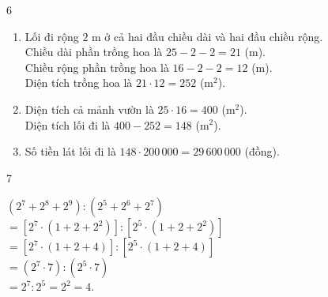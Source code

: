 \begin{Solbook}{6}
 \par \noindent  \begin {enumerate} \item Lối đi rộng $2$ m ở cả hai đầu chiều dài và hai đầu chiều rộng.\\ Chiều dài phần trồng hoa là $25-2-2=21$ (m).\\ Chiều rộng phần trồng hoa là $16-2-2=12$ (m).\\ Diện tích trồng hoa là $21\cdot 12=252$ (m$^{2}$). \item Diện tích cả mảnh vườn là $25\cdot 16=400$ (m$^{2}$).\\ Diện tích lối đi là $400-252=148$ (m$^{2}$). \item Số tiền lát lối đi là $148\cdot 200\,000=29\,600\,000$ (đồng). \end {enumerate}  \hfill \qedEX 
\end{Solbook}
\begin{Solbook}{7}
 \par \noindent  $\left (2^{7}+2^{8}+2^{9}\right ):\left (2^{5}+2^{6}+2^{7}\right )$\\ $=\left [2^{7}\cdot (1+2+2^{2})\right ]:\left [2^{5}\cdot (1+2+2^{2})\right ]$\\ $=\left [2^{7}\cdot (1+2+4)\right ]:\left [2^{5}\cdot (1+2+4)\right ]$\\ $=(2^{7}\cdot 7):(2^{5}\cdot 7)$\\ $=2^{7}:2^{5}=2^{2}=4$.  \hfill \qedEX 
\end{Solbook}
